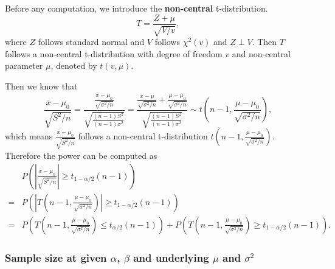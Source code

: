 \documentclass[a4paper,12pt]{article}
\begin{document}
Before any computation, we introduce the \textbf{non-central} t-distribution.
\begin{equation}
  \label{eq:noncentral-t-definition}
  T = \frac{Z + \mu}{\sqrt{V / v}}
  ,  
\end{equation}
where $Z$ follows standard normal and $V$ follows $\chi^2\left(v\right)$ and $Z\perp V$. Then $T$ follows a non-central t-distribution with degree of freedom $v$ and non-central parameter $\mu$, denoted by $t\left(v, \mu\right)$.
\par
Then we know that
\[
  \frac{\bar{x} - \mu_0}{\sqrt{S^2 / n}}
  = \frac{
    \frac{\bar{x} - \mu_0}{\sqrt{\sigma^2 / n}}
  }{
    \sqrt{
      \frac{\left(n - 1\right)S^2}{\left(n - 1\right)\sigma^2}
    }
  }
  = \frac{
    \frac{\bar{x} - \mu}{\sqrt{\sigma^2 / n}}
    + \frac{\mu - \mu_0}{\sqrt{\sigma^2 / n}}
  }{
    \sqrt{
      \frac{\left(n - 1\right)S^2}{\left(n - 1\right)\sigma^2}
    }
  }
  \sim t\left(n - 1, \frac{\mu - \mu_0}{\sqrt{\sigma^2 / n}}\right)
  ,
\]
which means $\frac{\bar{x} - \mu_0}{\sqrt{S^2 / n}}$ follows a non-central t-distribution $t\left(n - 1, \frac{\mu - \mu_0}{\sqrt{\sigma^2 / n}}\right)$. Therefore the power can be computed as
\begin{equation}
  \label{eq:power_equation_one_sample_sigma_unknown}
  \begin{aligned}
    & P\left(
      \left|
        \frac{\bar{x} - \mu_0}{\sqrt{S^2 / n}}
      \right|
      \geq t_{1 - \alpha / 2}\left(n - 1\right)
    \right)    \\
    =& P\left(
      \left|
        T\left(n - 1,  \frac{\mu - \mu_0}{\sqrt{\sigma^2 / n}}\right)
      \right|
      \geq t_{1 - \alpha / 2}\left(n - 1\right)
    \right)    \\
    =& P\left(
      T\left(n - 1,  \frac{\mu - \mu_0}{\sqrt{\sigma^2 / n}}\right)
      \leq t_{\alpha / 2}\left(n - 1\right)
    \right)
    + P\left(
      T\left(n - 1,  \frac{\mu - \mu_0}{\sqrt{\sigma^2 / n}}\right)
      \geq t_{1 - \alpha / 2}\left(n - 1\right)
    \right)
    .
  \end{aligned}  
\end{equation}

\subsubsection{Sample size at given $\alpha$, $\beta$ and underlying $\mu$ and $\sigma^2$}
\label{sec:sample-size-at-1}
\end{document}
